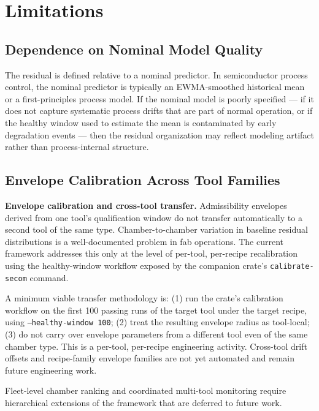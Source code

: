 \documentclass[11pt,letterpaper]{article}
\theoremstyle{scresult}
\begin{document}
\section{Limitations}
\label{sec:limitations}

\subsection{Dependence on Nominal Model Quality}

The residual is defined relative to a nominal predictor. In semiconductor
process control, the nominal predictor is typically an EWMA-smoothed
historical mean or a first-principles process model. If the nominal model
is poorly specified --- if it does not capture systematic process drifts that
are part of normal operation, or if the healthy window used to estimate the
mean is contaminated by early degradation events --- then the residual
organization may reflect modeling artifact rather than process-internal
structure.

\subsection{Envelope Calibration Across Tool Families}

\textbf{Envelope calibration and cross-tool transfer.}
Admissibility envelopes derived from one tool's qualification window do not
transfer automatically to a second tool of the same type. Chamber-to-chamber
variation in baseline residual distributions is a well-documented problem in
fab operations. The current framework addresses this only at the level of
per-tool, per-recipe recalibration using the healthy-window workflow exposed by
the companion crate's \texttt{calibrate-secom} command.

A minimum viable transfer methodology is: (1) run the crate's calibration
workflow on the first 100 passing runs of the target tool under the target
recipe, using \texttt{--healthy-window 100}; (2) treat the resulting envelope
radius as tool-local; (3) do not carry over envelope parameters from a
different tool even of the same chamber type. This is a per-tool, per-recipe
engineering activity. Cross-tool drift offsets and recipe-family envelope
families are not yet automated and remain future engineering work.

Fleet-level chamber ranking and coordinated multi-tool monitoring require
hierarchical extensions of the framework that are deferred to future work.
\end{document}
